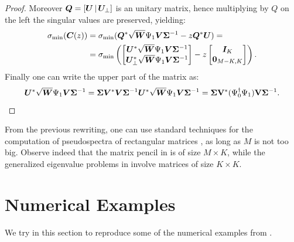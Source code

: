 \begin{proof}
Moreover $\vb*{Q} = [\vb*{U}\,\lvert\,\vb*{U}_\perp]$ is an unitary matrix, hence multiplying by $Q$ on the left the singular values are preserved, yielding:
\begin{equation*}
    \begin{split}
        \sigma_{\min}(\vb*{C}(z)) &= \sigma_{\min}(\vb*{Q}^*\sqrt{\vb*{W}}\Psi_1\vb*{V}\bm{\Sigma}^{-1} - z\vb*{Q}^*\vb*{U}) = \\
        & = \sigma_{\min}\left( 
        \begin{bmatrix}
        \vb*{U}^*\sqrt{\vb*{W}}\Psi_1 \vb*{V}\bm{\Sigma}^{-1}\\
        \vb*{U}_{\perp}^*\sqrt{\vb*{W}}\Psi_1 \vb*{V}\bm{\Sigma}^{-1}
        \end{bmatrix} - z 
        \begin{bmatrix}
        \vb*{I}_K\\
        \vb*{0}_{M-K, K}\\
        \end{bmatrix}
        \right).
    \end{split}
\end{equation*}
Finally one can write the upper part of the matrix as:
\begin{equation*}
    \vb*{U}^*\sqrt{\vb*{W}}\Psi_1 \vb*{V}\bm{\Sigma}^{-1} = \bm{\Sigma} \vb*{V}^* \vb*{V}\bm{\Sigma}^{-1}\vb*{U}^*\sqrt{\vb*{W}}\Psi_1 \vb*{V}\bm{\Sigma}^{-1} = \bm{\Sigma}\vb{V}^*(\Psi_0^\dagger \Psi_1)\vb{V}\bm{\Sigma}^{-1}.
\end{equation*}
\end{proof}

From the previous rewriting, one can use standard techniques for the computation of pseudospectra of rectangular matrices \cite{wright_pseudospectra_2002}, as long as $M$ is not too big. Observe indeed that the matrix pencil in \cite{prop_pseudospectrum} is of size $M\times K$, while the generalized eigenvalue problems in  involve matrices of size $K\times K$.

\section{Numerical Examples}
We try in this section to reproduce some of the numerical examples from \cite{colbrook_rigorous_2021}.

